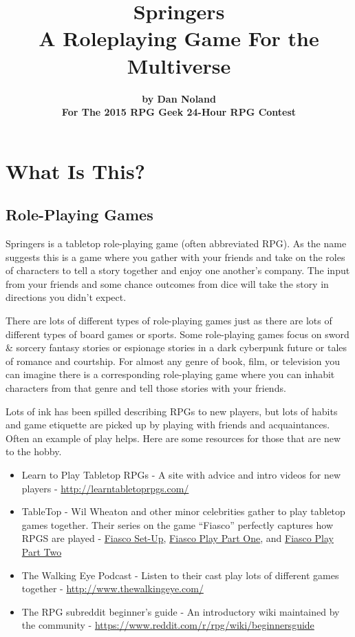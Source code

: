 \documentclass[letterpaper,12pt,landscape,twocolumn]{book}
\title{\Huge \textbf{Springers} \\ \Large A Roleplaying Game For the Multiverse }
\author{ \textbf{by Dan Noland} \\ \textbf{For The 2015 RPG Geek 24-Hour RPG Contest}}
\begin{document}
\RaggedRight
\frontmatter
\maketitle

\let\cleardoublepage\clearpage

\tableofcontents
\mainmatter
\chapter{What Is This?}
\section{Role-Playing Games}
Springers is a tabletop role-playing game (often abbreviated RPG). As
the name suggests this is a game where you gather with your friends
and take on the roles of characters to tell a story together and enjoy
one another's company. The input from your friends and some chance
outcomes from dice will take the story in directions you didn't
expect. 

There are lots of different types of role-playing games just as there
are lots of different types of board games or sports. Some
role-playing games focus on sword \& sorcery fantasy stories or
espionage stories in a dark cyberpunk future or tales of romance and
courtship. For almost any genre of book, film, or television you can
imagine there is a corresponding role-playing game where you can 
inhabit characters from that genre and tell those stories with your
friends. 

Lots of ink has been spilled describing RPGs to new players, but lots
of habits and game etiquette are picked up by playing with friends
and acquaintances. Often an example of play helps. Here are some
resources for those that are new to the hobby.

\begin{itemize}
\item Learn to Play Tabletop RPGs - A site with advice and intro
  videos for new players -
  \href{http://learntabletoprpgs.com/}{http://learntabletoprpgs.com/} 
\item TableTop - Wil Wheaton and other minor celebrities gather to
  play tabletop games together. Their series on the game ``Fiasco''
  perfectly captures how RPGS are played -
  \href{https://www.youtube.com/watch?v=uuJizhyf-y4}{Fiasco Set-Up},  
  \href{https://www.youtube.com/watch?v=WXJxQ0NbFtk}{Fiasco Play Part One},  
  and \href{https://www.youtube.com/watch?v=Aj7NcdDh-WM}{Fiasco
    Play Part Two}  
\item The Walking Eye Podcast - Listen to their cast play lots of
  different games together - \href{http://www.thewalkingeye.com/}{http://www.thewalkingeye.com/} 
\item The RPG subreddit beginner's guide - An introductory wiki
  maintained by the community - \href{https://www.reddit.com/r/rpg/wiki/beginnersguide}{https://www.reddit.com/r/rpg/wiki/beginnersguide} 
\end{itemize}
\end{document}
